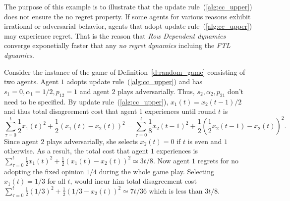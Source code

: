\begin{example}\label{regret_side_result}
The purpose of this example is to illustrate that 
the update rule~(\ref{alg:cc_upper}) does not ensure the no regret
property. If some agents for various reasons exhibit
irrational or adversarial behavior, agents that adopt update 
rule~(\ref{alg:cc_upper}) may experience regret. That is the reason
that \emph{Row Dependent dynamics} converge exponetially faster that any
\emph{no regret dynamics} incluing the \emph{FTL dynamics}.

Consider the instance of the game of Definition~\ref{d:random_game} consisting
of two agents. Agent $1$ adopts update rule~(\ref{alg:cc_upper}) and
has $s_1=0,\alpha_1=1/2,p_{12}=1$ and agent $2$ plays adversarially. Thus,
$s_2,\alpha_2,p_{21}$ don't need to be specified. By update rule~(\ref{alg:cc_upper}),
$x_1(t)=x_2(t-1)/2$ and thus total disagreement cost that agent $1$ experiences until
round $t$ is 
\begin{equation*}
 \sum_{\tau=0}^t\frac{1}{2}x_1(t)^2+\frac{1}{2}(x_1(t) - x_2(t))^2 =
 \sum_{\tau=0}^t\frac{1}{8}x_2(t-1)^2 + \frac{1}{2}(\frac{1}{2}x_2(t-1)-x_2(t))^2.
\end{equation*}
Since agent $2$ plays adversarially, she selects $x_2(t)=0$ if $t$ is even
and $1$ otherwise. As a result, the total cost that agent $1$ experiences is
$\sum_{\tau=0}^t \frac{1}{2}x_1(t)^2+\frac{1}{2}(x_1(t) - x_2(t))^2 \simeq 3t/8$.
Now agent $1$ regrets for no adopting the fixed opinion $1/4$ during the whole game play.
Selecting $x_1(t)=1/3$ for all $t$, would incur him total disagreement cost
$\sum_{\tau=0}^t\frac{1}{2}(1/3)^2+\frac{1}{2}(1/3 - x_2(t))^2\simeq 7t/36$
which is less than $3t/8$.
\end{example}
